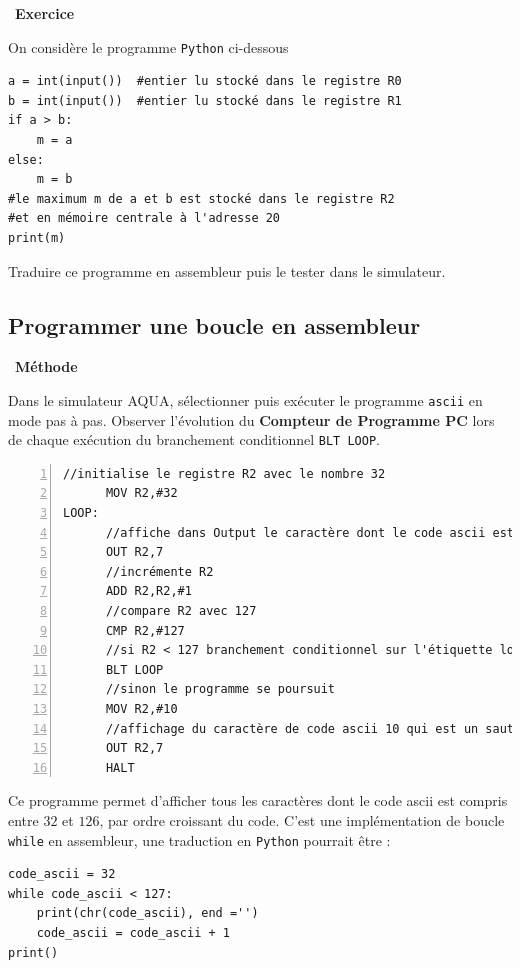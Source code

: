 \documentclass[a4paper, french, 11pt]{article}  %
\newcounter{exercice}
\newenvironment{exercice}[1]
{\par \medskip   \addtocounter{exercice}{1} \noindent  
\begin{bclogo}[arrondi =0.1,   noborder = true, logo=\bccrayon, marge=4]{~\textbf{Exercice} \textbf{\theexercice} {\itshape #1} }  \par}
{
\end{bclogo}
 \par \bigskip }
\newcounter{prog}
\newenvironment{methode}[1]
{\par \medskip    \noindent  
 \begin {bclogo}[arrondi =0.1,logo=\bcoutil, marge=4,noborder = true] {~\textbf{Méthode}   {\itshape #1} }  \par}
{
\end{bclogo}
 \par \bigskip }
\begin{document}
\begin{exercice}{}


On considère le programme \texttt{Python} ci-dessous
\begin{lstlisting}[style=rond]
a = int(input())  #entier lu stocké dans le registre R0
b = int(input())  #entier lu stocké dans le registre R1
if a > b:
	m = a         
else:
	m = b
#le maximum m de a et b est stocké dans le registre R2
#et en mémoire centrale à l'adresse 20
print(m)
\end{lstlisting}

Traduire ce programme en assembleur puis le tester dans le simulateur.

\end{exercice}

\subsection{Programmer une boucle en assembleur}

\begin{methode}{}

Dans le simulateur AQUA, sélectionner puis exécuter le programme \texttt{ascii} en mode pas à pas. Observer l'évolution du \textbf{Compteur de Programme PC} lors de chaque exécution du branchement conditionnel \texttt{BLT LOOP}.

\begin{lstlisting}[numbers=left, language={[x86masm]Assembler}]
	  //initialise le registre R2 avec le nombre 32
      MOV R2,#32
LOOP:
	  //affiche dans Output le caractère dont le code ascii est contenu dans R2
      OUT R2,7
      //incrémente R2
      ADD R2,R2,#1
      //compare R2 avec 127
      CMP R2,#127
      //si R2 < 127 branchement conditionnel sur l'étiquette loop
      BLT LOOP
      //sinon le programme se poursuit
      MOV R2,#10
      //affichage du caractère de code ascii 10 qui est un saut de ligne
      OUT R2,7
      HALT
\end{lstlisting}

Ce programme permet d'afficher tous les caractères dont le code ascii est compris entre $32$ et $126$, par ordre croissant du code. C'est une implémentation de boucle \texttt{while} en assembleur, une traduction en \texttt{Python} pourrait être :

\begin{lstlisting}[style=rond]
code_ascii = 32
while code_ascii < 127:
    print(chr(code_ascii), end ='')
    code_ascii = code_ascii + 1
print()
\end{lstlisting}

\end{methode}
\end{document}
